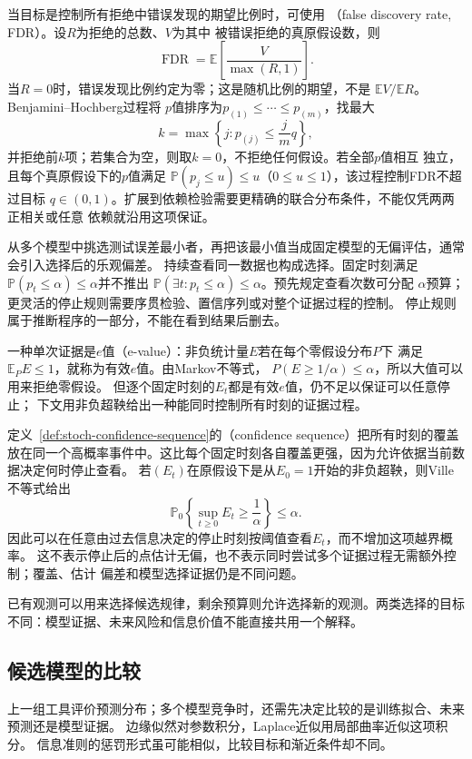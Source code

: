 当目标是控制所有拒绝中错误发现的期望比例时，可使用
（false discovery rate, FDR）。设\(R\)为拒绝的总数、\(V\)为其中
被错误拒绝的真原假设数，则
\[
  \operatorname{FDR}=\mathbb E\left[\frac{V}{\max(R,1)}\right].
\]
当\(R=0\)时，错误发现比例约定为零；这是随机比例的期望，不是
\(\mathbb EV/\mathbb ER\)。Benjamini--Hochberg过程将
\(p\)值排序为\(p_{(1)}\leq\cdots\leq p_{(m)}\)，找最大
\[
  k=\max\left\{j:p_{(j)}\leq\frac{j}{m}q\right\},
\]
并拒绝前\(k\)项；若集合为空，则取\(k=0\)，不拒绝任何假设。若全部\(p\)值相互
独立，且每个真原假设下的\(p\)值满足
\(\mathbb P(p_j\leq u)\leq u\)（\(0\leq u\leq1\)），该过程控制FDR不超过目标
\(q\in(0,1)\)。扩展到依赖检验需要更精确的联合分布条件，不能仅凭两两正相关或任意
依赖就沿用这项保证。

从多个模型中挑选测试误差最小者，再把该最小值当成固定模型的无偏评估，通常会引入选择后的乐观偏差。
持续查看同一数据也构成选择。固定时刻满足
\(\mathbb{P}(p_t\leq\alpha)\leq\alpha\)并不推出
\(\mathbb{P}(\exists t:p_t\leq\alpha)\leq\alpha\)。预先规定查看次数可分配
\(\alpha\)预算；更灵活的停止规则需要序贯检验、置信序列或对整个证据过程的控制。
停止规则属于推断程序的一部分，不能在看到结果后删去。

一种单次证据是\(e\)值（e-value）：非负统计量\(E\)若在每个零假设分布\(P\)下
满足\(\mathbb E_PE\leq1\)，就称为有效\(e\)值。由Markov不等式，
\(P(E\geq1/\alpha)\leq\alpha\)，所以大值可以用来拒绝零假设。
但逐个固定时刻的\(E_t\)都是有效\(e\)值，仍不足以保证可以任意停止；
下文用非负超鞅给出一种能同时控制所有时刻的证据过程。

定义~\ref{def:stoch-confidence-sequence}的（confidence sequence）把所有时刻的覆盖放在同一个高概率事件中。这比每个固定时刻各自覆盖更强，因为允许依据当前数据决定何时停止查看。
若\((E_t)\)在原假设下是从\(E_0=1\)开始的非负超鞅，则Ville不等式给出
\[
  \mathbb{P}_0\left\{\sup_{t\geq0}E_t\geq\frac1\alpha\right\}\leq\alpha.
\]
因此可以在任意由过去信息决定的停止时刻按阈值查看\(E_t\)，而不增加这项越界概率。
这不表示停止后的点估计无偏，也不表示同时尝试多个证据过程无需额外控制；覆盖、估计
偏差和模型选择证据仍是不同问题。

\label{sec:stats-model-comparison-data-acquisition}
已有观测可以用来选择候选规律，剩余预算则允许选择新的观测。两类选择的目标不同：模型证据、未来风险和信息价值不能直接共用一个解释。

\subsection{候选模型的比较}
\label{sec:statistics-model-evidence}
上一组工具评价预测分布；多个模型竞争时，还需先决定比较的是训练拟合、未来预测还是模型证据。
边缘似然对参数积分，Laplace近似用局部曲率近似这项积分。
信息准则的惩罚形式虽可能相似，比较目标和渐近条件却不同。

